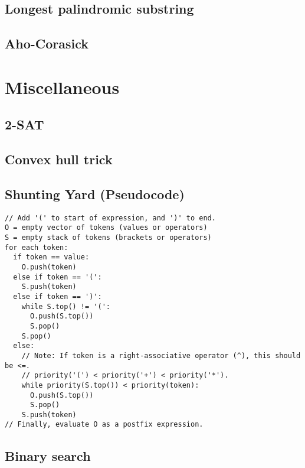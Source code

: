 \documentclass[9pt]{extarticle}
\begin{document}
\begin{multicols*}{3}
\subsection{Longest palindromic substring} %


\subsection{Aho-Corasick}


\section{Miscellaneous}

\subsection{2-SAT} %


\subsection{Convex hull trick} %


\subsection{Shunting Yard (Pseudocode)} %
\begin{lstlisting}
// Add '(' to start of expression, and ')' to end.
O = empty vector of tokens (values or operators)
S = empty stack of tokens (brackets or operators)
for each token:
  if token == value:
    O.push(token)
  else if token == '(':
    S.push(token)
  else if token == ')':
    while S.top() != '(':
      O.push(S.top())
      S.pop()
    S.pop()
  else:
    // Note: If token is a right-associative operator (^), this should be <=.
	// priority('(') < priority('+') < priority('*').
    while priority(S.top()) < priority(token):
      O.push(S.top())
      S.pop()
    S.push(token)
// Finally, evaluate O as a postfix expression.
\end{lstlisting}

\subsection{Binary search} %



\end{multicols*}
\end{document}

